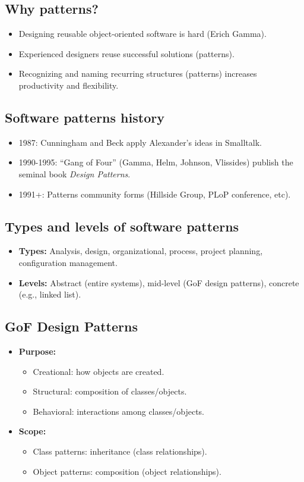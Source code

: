 \documentclass[11pt,a4paper]{article}
\begin{document}
\subsection*{Why patterns?}
\begin{itemize}
    \item Designing reusable object-oriented software is hard (Erich Gamma).
    \item Experienced designers reuse successful solutions (patterns).
    \item Recognizing and naming recurring structures (patterns) increases productivity and flexibility.
\end{itemize}

\subsection*{Software patterns history}
\begin{itemize}
    \item 1987: Cunningham and Beck apply Alexander’s ideas in Smalltalk.
    \item 1990-1995: ``Gang of Four'' (Gamma, Helm, Johnson, Vlissides) publish the seminal book \emph{Design Patterns}.
    \item 1991+: Patterns community forms (Hillside Group, PLoP conference, etc).
\end{itemize}

\subsection*{Types and levels of software patterns}
\begin{itemize}
    \item \textbf{Types:} Analysis, design, organizational, process, project planning, configuration management.
    \item \textbf{Levels:} Abstract (entire systems), mid-level (GoF design patterns), concrete (e.g., linked list).
\end{itemize}

\subsection*{GoF Design Patterns}
\begin{itemize}
    \item \textbf{Purpose:}
        \begin{itemize}
            \item Creational: how objects are created.
            \item Structural: composition of classes/objects.
            \item Behavioral: interactions among classes/objects.
        \end{itemize}
    \item \textbf{Scope:}
        \begin{itemize}
            \item Class patterns: inheritance (class relationships).
            \item Object patterns: composition (object relationships).
        \end{itemize}
\end{itemize}
\end{document}
